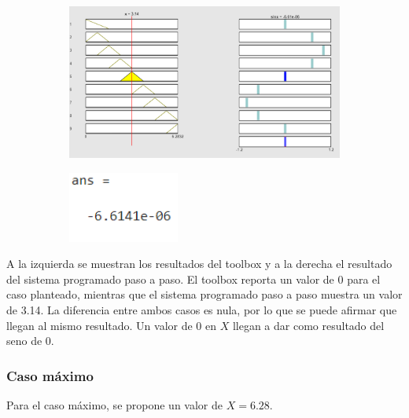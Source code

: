 \documentclass[11pt, letterpaper]{article}
\begin{document}
\begin{figure}[h]
	\centering
	\begin{subfigure}{0.40\textwidth} %
		\centering
		\includegraphics[width=1.4\textwidth]{IMG/RP12.png}
		\label{fig:G5}
	\end{subfigure}
	\hfill
	\begin{subfigure}{0.42\textwidth} %
		\centering
		\includegraphics[width=0.4\textwidth]{IMG/M12.png}
		\label{fig:G6}
	\end{subfigure}
	\label{fig:comparacion3}
\end{figure}

A la izquierda se muestran los resultados del toolbox y a la derecha el resultado del sistema programado paso a paso. El toolbox reporta un valor de 0 para el caso planteado, mientras que el sistema programado paso a paso muestra un valor de 3.14. La diferencia entre ambos casos es nula, por lo que se puede afirmar que llegan al mismo resultado. Un valor de 0 en $X$ llegan a dar como resultado del seno de 0.

\newpage

\subsubsection{Caso máximo}
Para el caso máximo, se propone un valor de $X = 6.28$.
\end{document}

